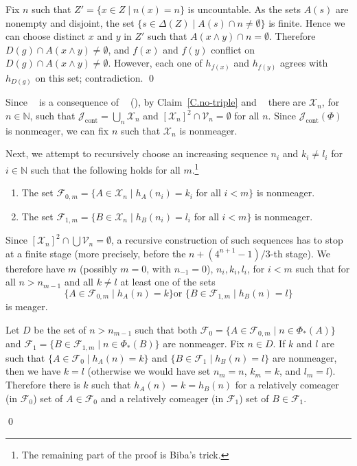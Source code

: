 \documentclass{amsart}
\makeatletter
\def\text{\mbox}
\theoremstyle{definition}
\theoremstyle{remark}
\DeclareMathOperator{\Ccont}{cont}
\newcommand{\Jcont}{\cJ_{\Ccont}}
\renewcommand{\proofname}{Proof}
\renewenvironment{proof}[1][\proofname]{\par
\let\oldqedsymbol\qedsymbol             %
  \normalfont
  \topsep6\p@\@plus6\p@ \trivlist
  \item[\hskip\labelsep\hskip\parindent\scshape
    #1\@addpunct{.}]\ignorespaces
}{%
  \qed\endtrivlist
\global\let\qedsymbol\oldqedsymbol      %
}
\newcommand{\bbN}{\mathbb N}
\newcommand{\cJ}{{\mathcal J}} %
\newcommand{\cV}{\mathcal V}
\newcommand{\cX}{\mathcal X}
\newcommand{\cF}{\mathcal F}
\DeclareMathOperator{\OCAT}{OCA_T}
\DeclareMathOperator{\OCAsharp}{OCA^\#}
\numberwithin{claim}{subsection}
\makeatother
\begin{document}
\begin{proof}[Proof of Theorem~\ref{T.OCAsharp-Fin}]
\begin{proof}
		Fix $n$ such that $Z'=\{x\in Z\mid n(x)=n\}$ is uncountable. As the sets $A(s)$ are nonempty and disjoint, the   set $\{s\in \Delta(Z)\mid A(s)\cap n\neq \emptyset\}$ is finite.  Hence we can  choose distinct $x$ and $y$ in $Z'$ such that $A(x\wedge y)\cap n=\emptyset$.  
		Therefore $D(g)\cap A(x\wedge y)\neq \emptyset$, and $f(x)$ and $f(y)$ conflict on $D(g)\cap A(x\wedge y)\neq \emptyset$. However, each one of $h_{f(x)}$ and $h_{f(y)}$ agrees with $h_{D(g)}$ on this set; contradiction. 
	\end{proof}
	
	Since $\OCAsharp$ is a consequence of $\OCAT$ (\cite[Theorem~3.3]{de2023trivial}), by Claim~\ref{C.no-triple} and $\OCAsharp$ there are $\cX_n$, for $n\in \bbN$, such that $\Jcont=\bigcup_n \cX_n$ and $[\cX_n]^2\cap \cV_n=\emptyset$ for all $n$. 
	Since $\Jcont(\Phi)$ is nonmeager,  we can fix $n$ such that 
	$\cX_n$ is nonmeager. 
	
	Next, we attempt to recursively choose an increasing sequence $n_i$ and $k_i\neq l_i$ for $i\in \bbN$ such that the following holds for all $m$.\footnote{The remaining  part of the proof  is Biba's trick.} 
	\begin{enumerate}
		\item The set $\cF_{0,m}=\{A\in \cX_n\mid h_A(n_i)=k_i$ for all $i<m\}$ is nonmeager. 
		\item The set $\cF_{1,m}=\{B\in \cX_n\mid h_B(n_i)=l_i$ for all $i<m\}$ is nonmeager.
	\end{enumerate} 
	Since $[\cX_n]^2\cap \bigcup\cV_n=\emptyset$, a recursive construction of such sequences has to stop at a finite stage (more precisely, before the $n+(4^{n+1}-1)/3$-th stage). We therefore have $m$ (possibly $m=0$, with $n_{-1}=0$), $n_i,k_i,l_i$, for $i<m$ such that for all $n>n_{m-1}$ and all $k\neq l$ at least one of the sets
	\[
	\{A\in \cF_{0,m}\mid h_A(n)=k \}
	\text{
		or
	}
	\{B\in \cF_{1,m}\mid h_B(n)=l \}
	\]
	is meager. 
	
	Let $D$ be the set of $n>n_{m-1}$ 
	such that both $\cF_0=\{A\in \cF_{0,m}\mid n\in \Phi_*(A)\}$ and $\cF_1=\{B\in \cF_{1,m}\mid n\in \Phi_*(B)\}$ are nonmeager. Fix $n\in D$. If $k$ and $l$ are such that $\{A\in \cF_0\mid h_A(n)=k\}$ and $\{B\in \cF_1\mid h_B(n)=l\}$ are nonmeager, then we have $k=l$ (otherwise we would have set $n_m=n$, $k_m=k$, and $l_m=l$). Therefore there is $k$ such that $h_A(n)=k=h_B(n)$ for a relatively  comeager (in $\cF_0$) set of $A\in \cF_0$ and a relatively  comeager (in $\cF_1$) set of $B\in \cF_1$. 
	

\end{proof}
\end{document}
